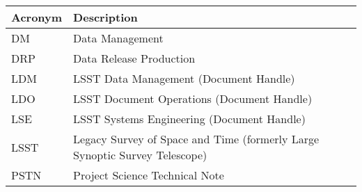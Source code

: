 \addtocounter{table}{-1}
\begin{longtable}{p{}p{}}\hline
\textbf{Acronym} & \textbf{Description}  \\\hline

DM & Data Management \\\hline
DRP & Data Release Production \\\hline
LDM & LSST Data Management (Document Handle) \\\hline
LDO & LSST Document Operations (Document Handle) \\\hline
LSE & LSST Systems Engineering (Document Handle) \\\hline
LSST & Legacy Survey of Space and Time (formerly Large Synoptic Survey Telescope) \\\hline
PSTN & Project Science Technical Note \\\hline
\end{longtable}
